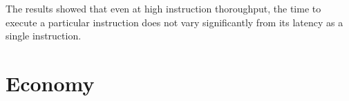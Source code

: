  The results showed that even at high instruction thoroughput, the time to execute a particular instruction does not vary significantly from its latency as a single instruction.


\section{Economy} %
\label{sec:economy}

